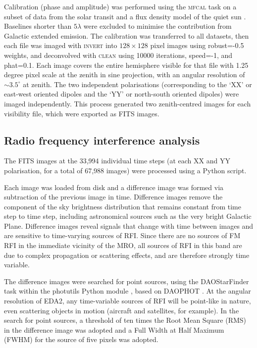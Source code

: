 Calibration (phase and amplitude) was performed using the \textsc{mfcal} task on a subset of data from the solar transit and a flux density model of the quiet sun \citep{sun_model}. Baselines shorter than $5\lambda$ were excluded to minimise the contribution from Galactic extended emission.
The calibration was transferred to all datasets, then each file was imaged with \textsc{invert} into $128\times128$ pixel images using robust=-0.5 weights, and deconvolved with \textsc{clean} using 10000 iterations, speed=-1, and phat=0.1. Each image covers the entire hemisphere visible for that file with 1.25 degree pixel scale at the zenith in sine projection, with an angular resolution of $\sim3.5^{\circ}$ at zenith.
The two independent polarisations (corresponding to the `XX' or east-west oriented dipoles and the `YY' or north-south oriented dipoles) were imaged independently.
This process generated two zenith-centred images for each visibility file, which were exported as FITS images. 

\subsection{Radio frequency interference analysis}
\label{subsec:ann}

The FITS images at the 33,994 individual time steps (at each XX and YY polarisation, for a total of 67,988 images) were processed using a Python script.

Each image was loaded from disk and a difference image was formed via subtraction of the previous image in time.  Difference images remove the component of the sky brightness distribution that remains constant from time step to time step, including astronomical sources such as the very bright Galactic Plane.  Difference images reveal signals that change with time between images and are sensitive to time-varying sources of RFI.  Since there are no sources of FM RFI in the immediate vicinity of the MRO, all sources of RFI in this band are due to complex propagation or scattering effects, and are therefore strongly time variable.

The difference images were searched for point sources, using the DAOStarFinder task within the photutils Python module \citep{Bradley_2019_2533376}, based on DAOPHOT \citep{1987PASP...99..191S}.  At the angular resolution of EDA2, any time-variable sources of RFI will be point-like in nature, even scattering objects in motion (aircraft and satellites, for example).  In the search for point sources, a threshold of ten times the Root Mean Square (RMS) in the difference image was adopted and a Full Width at Half Maximum (FWHM) for the source of five pixels was adopted.

